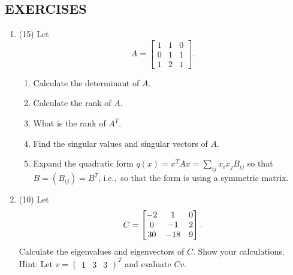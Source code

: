 \documentclass[12pt]{article}
\newtheorem*{solution}{Solution}
\newtheorem*{comments}{Comments}
\numberwithin{equation}{section}  %
\numberwithin{table}{section}
\numberwithin{algorithm}{section}
\theoremstyle{definition}
\newcommand{\<}{\langle}
\renewcommand{\>}{\rangle}
\begin{document}
\subsection{EXERCISES}
\begin{enumerate}
\item (15)
Let
\[ 
A = 
\begin{bmatrix}
1 & 1 & 0 \\
0 & 1 & 1 \\
1 & 2 & 1 
 \end{bmatrix}.
\]

\begin{enumerate}
\item
Calculate the determinant of $A$.
\item
Calculate the rank of $A$.
\item
What is the rank of $A^T$.
\item
Find the singular values and singular vectors of $A$.
\item
Expand the quadratic form $q(x) = x^TAx = \sum_{ij} x_ix_j B_{ij}$ so
that $B=(B_{ij}) = B^T$, i.e.,~so that the form is using a symmetric
matrix.
\end{enumerate}
  

\item (10)
Let
\[ 
C = 
 \begin{bmatrix}
-2 & 1 & 0\cr
0 & -1 & 2\cr
30 & -18 & 9
 \end{bmatrix}.
\]
Calculate the eigenvalues and eigenvectors of $C$. Show your
calculations.
\\Hint: Let $v = \begin{pmatrix}1& 3 & 3\end{pmatrix}^T$ and evaluate
$Cv$.

\end{enumerate}
\end{document}
